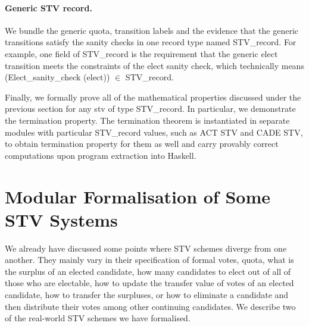 \documentclass{llncs}
\begin{document}
\paragraph{Generic STV record.} We bundle the generic quota,  transition labels and the evidence that the generic transitions satisfy the sanity checks in one record type named {\selectfont STV\_record}. For example, one field of {\selectfont STV\_record} is the requirement that the generic elect transition meets the constraints of the elect sanity check, which technically means ({\selectfont Elect\_sanity\_check (elect)}) $\in$ {\selectfont STV\_record}. 


Finally, we formally prove all of the mathematical properties
discussed under the previous section for any
{\selectfont stv} of type
{\selectfont STV\_record}. In particular, we
demonstrate the termination property. The termination theorem is
instantiated in separate modules with particular
{\selectfont STV\_record} values, such as ACT STV
and CADE STV, to obtain termination property for them as well and
carry provably correct computations upon program extraction into Haskell.
\section{Modular Formalisation of Some STV Systems}
We already have discussed some points where STV schemes diverge from one another. They mainly vary in their specification of formal votes, quota, what is the surplus of an elected candidate, how many candidates to elect out of all of those who are electable, how to update the transfer value of votes of an elected candidate, how to transfer the surpluses, or how to eliminate a candidate and then distribute their votes among other continuing candidates.
%
We describe two of the real-world STV schemes we have formalised. 
  
\end{document}
